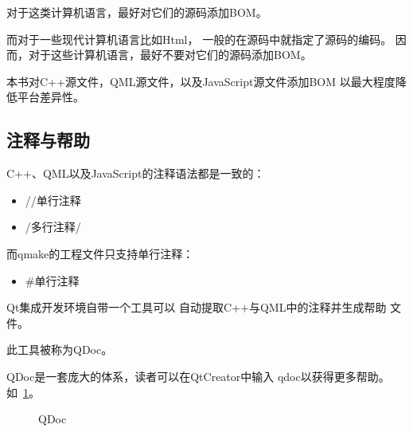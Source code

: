 对于这类计算机语言，最好对它们的源码添加BOM。

而对于一些现代计算机语言比如Html，
一般的在源码中就指定了源码的编码。
因而，对于这些计算机语言，最好不要对它们的源码添加BOM。

本书对C{\sourcefonttwo{}+}{\sourcefonttwo{}+}源文件，QML源文件，以及JavaScript源文件添加BOM
以最大程度降低平台差异性。

\FloatBarrier
\subsection{
注释与帮助
}\label{c000011s000000s02}


C{\sourcefonttwo{}+}{\sourcefonttwo{}+}、QML以及JavaScript的注释语法都是一致的：

\begin{itemize}
\item //单行注释
\item /\raisebox{-0.35ex}{\sourcefonttwo{}*}多行注释\raisebox{-0.35ex}{\sourcefonttwo{}*}/
\end{itemize}

而qmake的工程文件只支持单行注释：
\begin{itemize}
\item {\sourcefonttwo\#}单行注释
\end{itemize}



Qt集成开发环境自带一个工具可以
自动提取C{\sourcefonttwo{}+}{\sourcefonttwo{}+}与QML中的注释并生成帮助
文件。

此工具被称为QDoc。

QDoc是一套庞大的体系，读者可以在QtCreator中输入
qdoc以获得更多帮助。
如\figurename\ \ref{p000043}。

\begin{figure}[htb] %
\marginnote{\setlength\fboxsep{2pt}\fbox{\footnotesize{\kaishu\figurename\,}\footnotesize{\ref{p000043}}}}\centering %
\setlength\fboxsep{0pt} %
\caption{QDoc} %
\label{p000043} %
\end{figure}


































